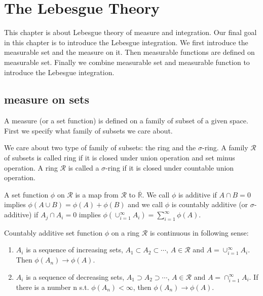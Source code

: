% 
\chapter{The Lebesgue Theory}
This chapter is about Lebesgue theory of measure and integration. Our final goal in this chapter is to introduce the Lebesgue integration. We first introduce the measurable set and the measure on it. Then measurable functions are defined on measurable set. Finally we combine measurable set and measurable function to introduce the Lebesgue integration.
\section{measure on sets}
A measure (or a set function) is defined on a family of subset of a given space. First we specify what family of subsets we care about.\par
We care about two type of family of subsets: the ring and the $\sigma$-ring. A family $\mathscr{R}$ of subsets is called ring if it is closed under union operation and set minus operation. A ring $\mathscr{R}$ is called a $\sigma$-ring if it is closed under countable union operation.\par
A set function $\phi$ on $\mathscr{R}$ is a map from $\mathscr{R}$ to $\overline{\mathbb{R}}$. We call $\phi$ is additive if $A\cap B=0$ implies $\phi(A\cup B)=\phi(A)+\phi(B)$ and we call $\phi$ is countably additive (or $\sigma$-additive) if $A_j\cap A_i=0$ implies $\phi(\cup_{i=1}^\infty A_i)=\sum_{i=1}^\infty\phi(A)$.\par 
Countably additive set function $\phi$ on a ring $\mathscr{R}$ is continuous in following sense:
\begin{enumerate}
    \item $A_i$ is a sequence of increasing sets, $A_1\subset A_2\subset\cdots$, $A\in \mathscr{R}$ and $A=\cup_{i=1}^\infty A_i$. Then $\phi(A_n)\to \phi(A)$.
    \item $A_i$ is a sequence of decreasing sets, $A_1\supset A_2\supset\cdots$, $A\in \mathscr{R}$ and $A=\cap_{i=1}^\infty A_i$. If there is a number n s.t. $\phi(A_n)<\infty$, then $\phi(A_n)\to \phi(A)$.
\end{enumerate}

